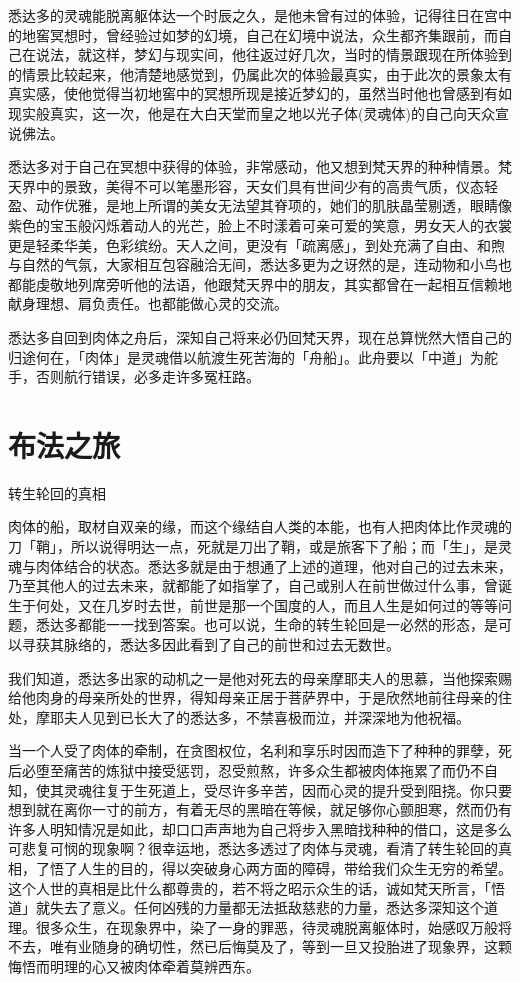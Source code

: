 \documentclass[12pt,twoside,openany]{book}
\begin{document}
悉达多的灵魂能脱离躯体达一个时辰之久，是他未曾有过的体验，记得往日在宫中的地窖冥想时，曾经验过如梦的幻境，自己在幻境中说法，众生都齐集跟前，而自己在说法，就这样，梦幻与现实间，他往返过好几次，当时的情景跟现在所体验到的情景比较起来，他清楚地感觉到，仍属此次的体验最真实，由于此次的景象太有真实感，使他觉得当初地窖中的冥想所现是接近梦幻的，虽然当时他也曾感到有如现实般真实，这一次，他是在大白天堂而皇之地以光子体(灵魂体)的自己向天众宣说佛法。

悉达多对于自己在冥想中获得的体验，非常感动，他又想到梵天界的种种情景。梵天界中的景致，美得不可以笔墨形容，天女们具有世间少有的高贵气质，仪态轻盈、动作优雅，是地上所谓的美女无法望其脊项的，她们的肌肤晶莹剔透，眼睛像紫色的宝玉般闪烁着动人的光芒，脸上不时漾着可亲可爱的笑意，男女天人的衣裳更是轻柔华美，色彩缤纷。天人之间，更没有「疏离感」，到处充满了自由、和煦与自然的气氛，大家相互包容融洽无间，悉达多更为之讶然的是，连动物和小鸟也都能虔敬地列席旁听他的法语，他跟梵天界中的朋友，其实都曾在一起相互信赖地献身理想、肩负责任。也都能做心灵的交流。

悉达多自回到肉体之舟后，深知自己将来必仍回梵天界，现在总算恍然大悟自己的归途何在，「肉体」是灵魂借以航渡生死苦海的「舟船」。此舟要以「中道」为舵手，否则航行错误，必多走许多冤枉路。

\section{布法之旅}\label{sec1.19}

转生轮回的真相

肉体的船，取材自双亲的缘，而这个缘结自人类的本能，也有人把肉体比作灵魂的刀「鞘」，所以说得明达一点，死就是刀出了鞘，或是旅客下了船；而「生」，是灵魂与肉体结合的状态。悉达多就是由于想通了上述的道理，他对自己的过去未来，乃至其他人的过去未来，就都能了如指掌了，自己或别人在前世做过什么事，曾诞生于何处，又在几岁时去世，前世是那一个国度的人，而且人生是如何过的等等问题，悉达多都能一一找到答案。也可以说，生命的转生轮回是一必然的形态，是可以寻获其脉络的，悉达多因此看到了自己的前世和过去无数世。

我们知道，悉达多出家的动机之一是他对死去的母亲摩耶夫人的思慕，当他探索赐给他肉身的母亲所处的世界，得知母亲正居于菩萨界中，于是欣然地前往母亲的住处，摩耶夫人见到已长大了的悉达多，不禁喜极而泣，并深深地为他祝福。

当一个人受了肉体的牵制，在贪图权位，名利和享乐时因而造下了种种的罪孽，死后必堕至痛苦的炼狱中接受惩罚，忍受煎熬，许多众生都被肉体拖累了而仍不自知，使其灵魂往复于生死道上，受尽许多辛苦，因而心灵的提升受到阻挠。你只要想到就在离你一寸的前方，有着无尽的黑暗在等候，就足够你心颤胆寒，然而仍有许多人明知情况是如此，却口口声声地为自己将步入黑暗找种种的借口，这是多么可悲复可悯的现象啊？很幸运地，悉达多透过了肉体与灵魂，看清了转生轮回的真相，了悟了人生的目的，得以突破身心两方面的障碍，带给我们众生无穷的希望。这个人世的真相是比什么都尊贵的，若不将之昭示众生的话，诚如梵天所言，「悟道」就失去了意义。任何凶残的力量都无法抵敌慈悲的力量，悉达多深知这个道理。很多众生，在现象界中，染了一身的罪恶，待灵魂脱离躯体时，始感叹万般将不去，唯有业随身的确切性，然已后悔莫及了，等到一旦又投胎进了现象界，这颗悔悟而明理的心又被肉体牵着莫辨西东。
\end{document}
